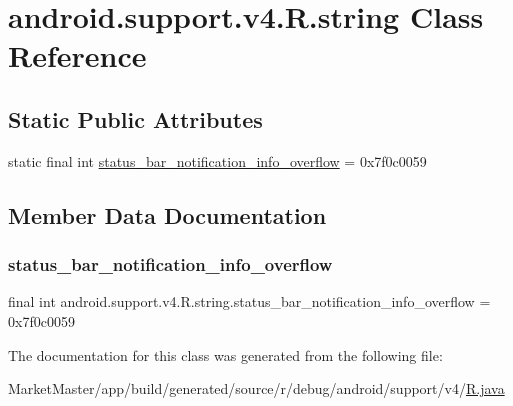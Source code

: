 \hypertarget{classandroid_1_1support_1_1v4_1_1R_1_1string}{}\section{android.\+support.\+v4.\+R.\+string Class Reference}
\label{classandroid_1_1support_1_1v4_1_1R_1_1string}
\subsection*{Static Public Attributes}
\begin{DoxyCompactItemize}
\item 
static final int \mbox{\hyperlink{classandroid_1_1support_1_1v4_1_1R_1_1string_ad88576c15d5591bc789ca0c9f54796d2}{status\+\_\+bar\+\_\+notification\+\_\+info\+\_\+overflow}} = 0x7f0c0059
\end{DoxyCompactItemize}


\subsection{Member Data Documentation}
\mbox{\label{classandroid_1_1support_1_1v4_1_1R_1_1string_ad88576c15d5591bc789ca0c9f54796d2}} 
\subsubsection{\texorpdfstring{status\+\_\+bar\+\_\+notification\+\_\+info\+\_\+overflow}{status\_bar\_notification\_info\_overflow}}
{\footnotesize\ttfamily final int android.\+support.\+v4.\+R.\+string.\+status\+\_\+bar\+\_\+notification\+\_\+info\+\_\+overflow = 0x7f0c0059\hspace{0.3cm}{\ttfamily [static]}}



The documentation for this class was generated from the following file\+:\begin{DoxyCompactItemize}
\item 
Market\+Master/app/build/generated/source/r/debug/android/support/v4/\mbox{\hyperlink{debug_2android_2support_2v4_2R_8java}{R.\+java}}\end{DoxyCompactItemize}
